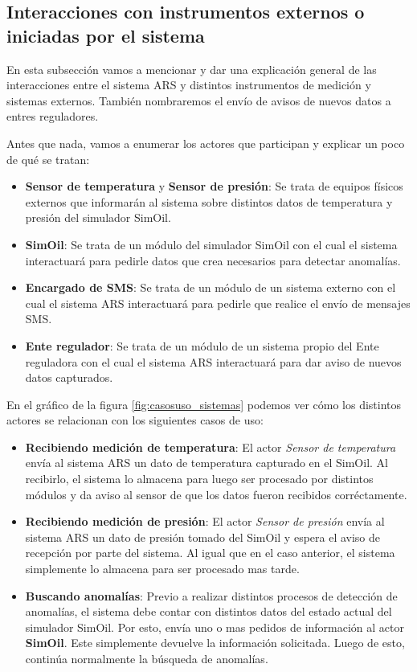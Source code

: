 \subsection{Interacciones con instrumentos externos o iniciadas por el sistema}

\par En esta subsección vamos a mencionar y dar una explicación general de las interacciones entre el sistema ARS y distintos instrumentos de medición y sistemas externos. También nombraremos el envío de avisos de nuevos datos a entres reguladores.

\par Antes que nada, vamos a enumerar los actores que participan y explicar un poco de qué se tratan:
\begin{itemize}
  \item \textbf{Sensor de temperatura} y \textbf{Sensor de presión}: Se trata de equipos físicos externos que informarán al sistema sobre distintos datos de temperatura y presión del simulador SimOil.
  \item \textbf{SimOil}: Se trata de un módulo del simulador SimOil con el cual el sistema interactuará para pedirle datos que crea necesarios para detectar anomalías.
  \item \textbf{Encargado de SMS}: Se trata de un módulo de un sistema externo con el cual el sistema ARS interactuará para pedirle que realice el envío de mensajes SMS.
  \item \textbf{Ente regulador}: Se trata de un módulo de un sistema propio del Ente reguladora con el cual el sistema ARS interactuará para dar aviso de nuevos datos capturados.
\end{itemize}

\par En el gráfico de la figura \ref{fig:casosuso_sistemas} podemos ver cómo los distintos actores se relacionan con los siguientes casos de uso:

\begin{itemize}
  \item \textbf{Recibiendo medición de temperatura}: El actor \textit{Sensor de temperatura} envía al sistema ARS un dato de temperatura capturado en el SimOil. Al recibirlo, el sistema lo almacena para luego ser procesado por distintos módulos y da aviso al sensor de que los datos fueron recibidos corréctamente.
  \item \textbf{Recibiendo medición de presión}: El actor \textit{Sensor de presión} envía al sistema ARS un dato de presión tomado del SimOil y espera el aviso de recepción por parte del sistema. Al igual que en el caso anterior, el sistema simplemente lo almacena para ser procesado mas tarde.
  \item \textbf{Buscando anomalías}: Previo a realizar distintos procesos de detección de anomalías, el sistema debe contar con distintos datos del estado actual del simulador SimOil. Por esto, envía uno o mas pedidos de información al actor \textbf{SimOil}. Este simplemente devuelve la información solicitada. Luego de esto, continúa normalmente la búsqueda de anomalías.
\end{itemize}

